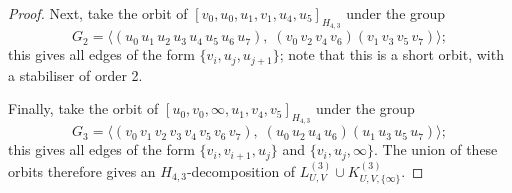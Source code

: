 \begin{subappendices}
\begin{proof}
Next, take the orbit of $[v_0, u_0, u_1, v_1, u_4, u_5]_{H_{4,3}}$ under the group
\[
    G_2 = \langle (u_0 \, u_1 \, u_2 \, u_3 \, u_4 \, u_5 \, u_6 \, u_7), \;
    (v_0 \, v_2 \, v_4 \, v_6) (v_1 \, v_3 \, v_5 \, v_7)\rangle;
\]
this gives all edges of the form $\{v_i, u_j, u_{j+1}\}$; note that this is a
short orbit, with a stabiliser of order 2.

Finally, take the orbit of $[u_0, v_0, \infty, u_1, v_4, v_5]_{H_{4,3}}$ under the group
\[
    G_3 = \langle (v_0 \, v_1 \, v_2 \, v_3 \, v_4 \, v_5 \, v_6 \, v_7), \;
    (u_0 \, u_2 \, u_4 \, u_6) (u_1 \, u_3 \, u_5 \, u_7)\rangle;
\]
this gives all edges of the form $\{v_i, v_{i+1}, u_j\}$ and $\{v_i, u_j, \infty\}$.
The union of these orbits therefore gives an ${H_{4,3}}$-decomposition of $L_{U,V}^{(3)} \cup K_{U,V,\{\infty\}}^{(3)}$.
\end{proof}

\end{subappendices}